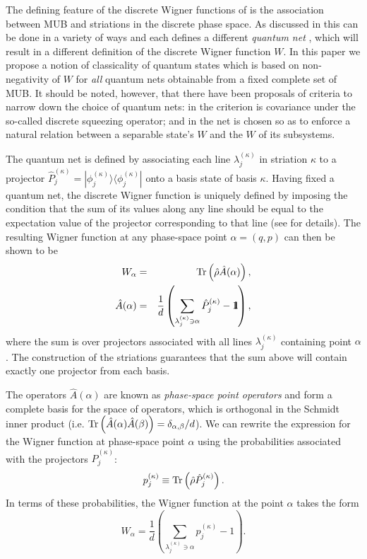 \documentclass[aps,twocolumn,showpacs,nofootinbib,superscriptaddress]{revtex4}
\begin{document}
The defining feature of the discrete Wigner functions of
\cite{GibbonsHW04} is the association between MUB and striations
in the discrete phase space. As discussed in \cite{GibbonsHW04}
this can be done in a variety of ways and each defines a different
\textit{quantum net} \cite{GibbonsHW04}, which will result in a
different definition of the discrete Wigner function $W$. In this
paper we propose a notion of classicality of quantum states which
is based on non-negativity of $W$ for \textit{all} quantum nets
obtainable from a fixed complete set of MUB. It should be noted,
however, that there have been proposals of criteria to narrow down
the choice of quantum nets: in \cite{PazRS04b} the criterion is
covariance under the so-called discrete squeezing operator; and in
\cite{PittengerR05} the net is chosen so as to enforce a natural
relation between a separable state's $W$ and the $W$ of its
subsystems.

The quantum net is defined by associating each line
$\lambda^{(\kappa)}_j$ in striation $\kappa$ to a projector
$\hat{P}_j^{(\kappa)}=|\phi^{(\kappa)}_j\rangle\langle
\phi^{(\kappa)}_{j} |$ onto a basis state  of basis $\kappa$.
Having fixed a quantum net, the discrete Wigner function is
uniquely defined by imposing the condition that the sum of its
values along any line should be equal to the expectation value of
the projector corresponding to that line (see \cite{GibbonsHW04}
for details). The resulting Wigner function at any phase-space
point $\alpha=(q,p)$ can then be shown to be
\begin{eqnarray}
W_{\alpha}&=&{\rm Tr}\left(\hat{\rho} \hat{A}(\alpha)\right),\\
\hat{A}(\alpha)&=&\frac{1}{d}\left(
\sum_{\lambda^{(\kappa)}_j \ni \alpha} \hat{P}^{(\kappa)}_j - \mbox{$1
\hspace{-1.0mm}  {\bf l}$}  \right),\label{eqpointop}
\label{eqwgen}
\end{eqnarray}
where the sum is over projectors associated with all lines $\lambda^{(\kappa)}_j$ containing point $\alpha$. The construction of the striations guarantees that the sum above will contain exactly one projector from each basis.

The operators $\hat{A}(\alpha)$ are known as \textit{phase-space point operators} and form a
complete basis for the space of operators, which is orthogonal in the Schmidt inner
product (i.e. ${\rm Tr}\left(\hat{A}(\alpha)\hat{A}(\beta)\right)=\delta_{\alpha,\beta}/d$).
We can rewrite the expression for the Wigner function at phase-space point $\alpha$ using
the probabilities associated with the projectors $\hat{P}^{(\kappa)}_j$:
\begin{equation}
p^{(\kappa)}_j\equiv{\rm Tr}\left(\hat{\rho} \hat{P}^{(\kappa)}_j\right).
\label{defprob}
\end{equation}
In terms of these probabilities, the Wigner function at the point $\alpha$ takes the form
\begin{equation}
W_{\alpha}=\frac{1}{d} \left( \sum_{\lambda^{(\kappa)}_j \ni \alpha}
p^{(\kappa)}_j - 1  \right).
\label{eqwprob}
\end{equation}
\end{document}
